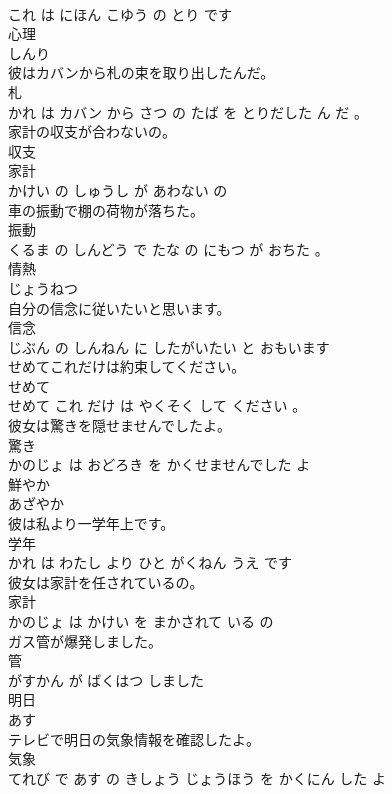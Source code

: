 \documentclass[8pt]{extreport}
\begin{document}
\begin{CJK}{UTF8}{min}
\\	これ は にほん こゆう の とり です			
\\	心理	
\\	しんり			
\\	彼はカバンから札の束を取り出したんだ。	
\\	札 
\\	かれ は カバン から さつ の たば を とりだした ん だ 。			
\\	家計の収支が合わないの。	
\\	収支 
\\	家計 
\\	かけい の しゅうし が あわない の			
\\	車の振動で棚の荷物が落ちた。	
\\	振動 
\\	くるま の しんどう で たな の にもつ が おちた 。			
\\	情熱	
\\	じょうねつ			
\\	自分の信念に従いたいと思います。	
\\	信念 
\\	じぶん の しんねん に したがいたい と おもいます			
\\	せめてこれだけは約束してください。	
\\	せめて 
\\	せめて これ だけ は やくそく して ください 。			
\\	彼女は驚きを隠せませんでしたよ。	
\\	驚き 
\\	かのじょ は おどろき を かくせませんでした よ			
\\	鮮やか	
\\	あざやか			
\\	彼は私より一学年上です。	
\\	学年 
\\	かれ は わたし より ひと がくねん うえ です			
\\	彼女は家計を任されているの。	
\\	家計 
\\	かのじょ は かけい を まかされて いる の			
\\	ガス管が爆発しました。	
\\	管 
\\	がすかん が ばくはつ しました			
\\	明日	
\\	あす			
\\	テレビで明日の気象情報を確認したよ。	
\\	気象 
\\	てれび で あす の きしょう じょうほう を かくにん した よ			

\end{CJK}
\end{document}
